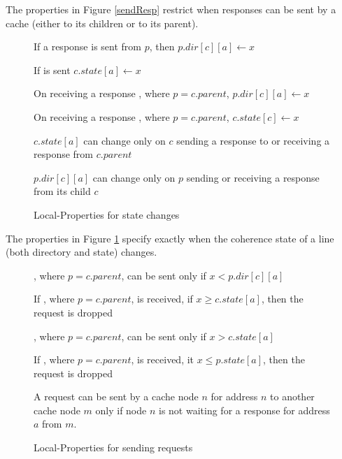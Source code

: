 The properties in Figure \ref{sendResp} restrict when responses can be sent by
 a cache (either to its children or to its parent).

\begin{figure}\small
\begin{inv}
If a response  is sent from $p$, then $p.dir[c][a] \gets x$\label{cSendRespPost}
\end{inv}
\begin{inv}
If  is sent $c.state[a] \gets x$\label{pSendRespPost}
\end{inv}
\begin{inv}
On receiving a response , where $p = c.parent$, $p.dir[c][a]
\gets x$\label{pRecvResp}
\end{inv}
\begin{inv}
On receiving a response , where $p = c.parent$, $c.state[c]
\gets x$\label{cRecvResp}
\end{inv}
\begin{inv}
$c.state[a]$ can change only on $c$ sending a response to or receiving a
response from $c.parent$\label{cState}
\end{inv}
\begin{inv}
$p.dir[c][a]$ can change only on $p$ sending or receiving a response from
its child $c$\label{pState}
\end{inv}
\caption{Local-Properties for state changes}
\label{stateChange}
\end{figure}

The properties in Figure \ref{stateChange} specify exactly when the coherence state of
a line (both directory and state) changes.

\begin{figure}\small
\begin{inv}
, where $p = c.parent$, can be sent only if $x < p.dir[c][a]$\label{pSendReqPre}
\end{inv}
\begin{inv}
If , where $p = c.parent$, is received, if $x \ge c.state[a]$,
then the request is dropped\label{pSendReqPost}
\end{inv}
\begin{inv}
, where $p = c.parent$, can be sent only if $x > c.state[a]$\label{cSendReqPre}
\end{inv}
\begin{inv}
If , where $p = c.parent$, is received, it $x \le p.state[a]$,
then the request is dropped\label{cSendReqPost}
\end{inv}
\begin{inv}
A request can be sent by a cache node $n$ for address $n$ to another cache node $m$ only if
node $n$ is not waiting for a response for address $a$ from $m$.
\label{nodoublereq}
\end{inv}
\caption{Local-Properties for sending requests}
\label{sendReq}
\end{figure}

